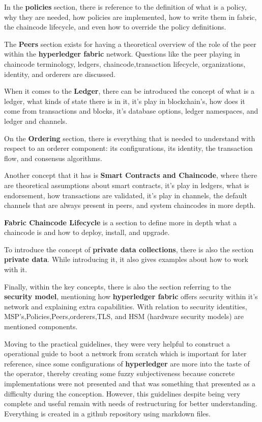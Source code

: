 In the \textbf{policies} section, there is reference to the definition of what is a policy, why they are needed, how policies are implemented, how to write them in fabric, the chaincode lifecycle, and even how to override the policy definitions.

The \textbf{Peers} section exists for having a theoretical overview of the role of the peer within the \textbf{hyperledger fabric} network. Questions like the peer playing in chaincode terminology, ledgers, chaincode,transaction lifecycle, organizations, identity, and orderers are discussed.

When it comes to the \textbf{Ledger}, there can be introduced the concept of what is a ledger, what kinds of state there is in it, it's play in blockchain's, how does it come from transactions and blocks, it's database options, ledger namespaces, and ledger and channels.

On the \textbf{Ordering} section, there is everything that is needed to understand with respect to an orderer component: its configurations, its identity, the transaction flow, and consensus algorithms.

Another concept that it has is \textbf{Smart Contracts and Chaincode}, where there are theoretical assumptions about smart contracts, it's play in ledgers, what is endorsement, how transactions are validated, it's play in channels, the default channels that are always present in peers, and system chaincodes in more depth.

\textbf{Fabric Chaincode Lifecycle} is a section to define more in depth what a chaincode is and how to deploy, install, and upgrade.

To introduce the concept of \textbf{private data collections}, there is also the section \textbf{private data}. While introducing it, it also gives examples about how to work with it.

Finally, within the key concepts, there is also the section referring to the \textbf{security model}, mentioning how \textbf{hyperledger fabric} offers security within it's network and explaining extra capabilities. With relation to security identities, MSP's,Policies,Peers,orderers,TLS, and HSM (hardware security models) are mentioned components.

Moving to the practical guidelines, they were very helpful to construct a operational guide to boot a network from scratch which is important for later reference, since some configurations of \textbf{hyperledger} are more into the taste of the operator, thereby creating some fuzzy subjectiveness because concrete implementations were not presented and that was something that presented as a difficulty during the conception.  However, this guidelines despite being very complete and useful remain with needs of restructuring for better understanding. Everything is created in a github repository using markdown files.

